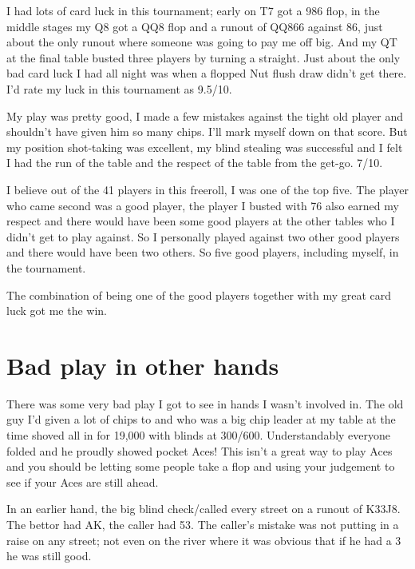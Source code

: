 I had lots of card luck in this tournament; early on T7 got a 986 flop,
in the middle stages my Q8 got a QQ8 flop and a runout of QQ866 against
86, just about the only runout where someone was going to pay me off big.
And my QT at the final table busted three players by turning a straight.
Just about the only bad card luck I had all night was when a flopped
Nut flush draw didn't get there. I'd rate my luck in this tournament
as 9.5/10.

My play was pretty good, I made a few mistakes against the tight old
player and shouldn't have given him so many chips. I'll mark myself
down on that score. But my position shot-taking was excellent, my blind
stealing was successful and I felt I had the run of the table and
the respect of the table from the get-go. 7/10.

I believe out of the 41 players in this freeroll, I was one of
the top five. The player who came second was a good player, the player
I busted with 76 also earned my respect and there would have been
some good players at the other tables who I didn't get to play
against. So I personally played against two other good players
and there would have been two others. So five good players,
including myself, in the tournament.

The combination of being one of the good players together
with my great card luck got me the win.

\section{Bad play in other hands}

There was some very bad play I got to see in hands I wasn't involved in.
The old guy I'd given a lot of chips to and who was a big chip leader
at my table at the time shoved all in for 19,000 with blinds at 300/600.
Understandably everyone folded and he proudly showed pocket Aces! This
isn't a great way to play Aces and you should be letting some people
take a flop and using your judgement to see if your Aces are still ahead.

In an earlier hand, the big blind check/called every street on a runout
of K33J8. The bettor had AK, the caller had 53. The caller's mistake was
not putting in a raise on any street; not even on the river where it
was obvious that if he had a 3 he was still good.
